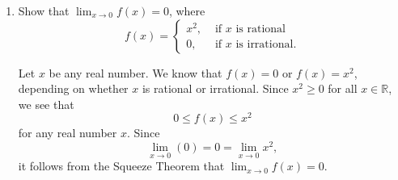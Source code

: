 \documentclass[letterpaper,12pt]{article}
\newcommand{\R}{\mathbb{R}}
\newcommand{\di}{\displaystyle}
\begin{document}
\begin{enumerate}
\newpage

 \item Show that $\di \lim_{x\to 0}f(x)=0$, where
 \[
 f(x) = \begin{cases}x^2, &\text{ if } x \text{ is rational}\\ 0, & \text{ if } x \text{ is irrational}.\end{cases}
 \]
 
 Let $x$ be any real number. We know that $f(x)=0$ or $f(x)=x^2$, depending on whether $x$ is rational or irrational. Since $x^2\geq 0$ for all $x\in \R$, we see that
 \[
 0\leq f(x)\leq x^2
 \]
 for any real number $x$. Since
 \[
 \lim_{x\to 0}(0) = 0 = \lim_{x\to 0}x^2,
 \]
 it follows from the Squeeze Theorem that $\di \lim_{x\to 0}f(x)=0$.
 
 \end{enumerate}
\end{document}
